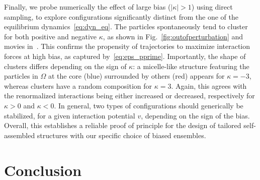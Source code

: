 \documentclass[superscriptaddress, twocolumn, prx, longbibliography, nofootinbib]{revtex4-1}
\begin{document}


Finally, we probe numerically the effect of large bias ($|\kappa|>1$) using direct sampling, to explore configurations significantly distinct from the one of the equilibrium dynamics~\eqref{eq:dyn_eq}. The particles spontaneously tend to cluster for both positive and negative $\kappa$, as shown in Fig.~\ref{fig:outofperturbation} and movies in~\cite{movie}. This confirms the propensity of trajectories to maximize interaction forces at high bias, as captured by~\eqref{eq:eps_pprime}. Importantly, the shape of clusters differs depending on the sign of $\kappa$: a micelle-like structure featuring the particles in $\Omega$ at the core (blue) surrounded by others (red) appears for $\kappa=-3$, whereas clusters have a random composition for $\kappa=3$. Again, this agrees with the renormalized interactions being either increased or decreased, respectively for $\kappa>0$ and $\kappa<0$. In general, two types of configurations should generically be stabilized, for a given interaction potential $v$, depending on the sign of the bias. Overall, this establishes a reliable proof of principle for the design of tailored self-assembled structures with our specific choice of biased ensembles.




\section{Conclusion}
\end{document}
